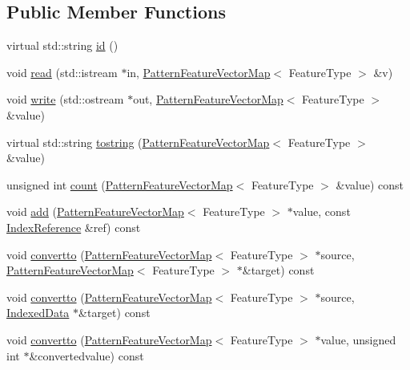 \subsection*{Public Member Functions}
\begin{DoxyCompactItemize}
\item 
virtual std\+::string \hyperlink{classPatternFeatureVectorMapHandler_ac3a86c293fbc3417ae6d8dc13389be82}{id} ()
\item 
void \hyperlink{classPatternFeatureVectorMapHandler_a3956b0d0deccf1a3f36135d084a30627}{read} (std\+::istream $\ast$in, \hyperlink{classPatternFeatureVectorMap}{Pattern\+Feature\+Vector\+Map}$<$ Feature\+Type $>$ \&v)
\item 
void \hyperlink{classPatternFeatureVectorMapHandler_a188df59b0fe05271e3ee90ba20204ffa}{write} (std\+::ostream $\ast$out, \hyperlink{classPatternFeatureVectorMap}{Pattern\+Feature\+Vector\+Map}$<$ Feature\+Type $>$ \&value)
\item 
virtual std\+::string \hyperlink{classPatternFeatureVectorMapHandler_a27faed3107244e4ab0f53e3acea201de}{tostring} (\hyperlink{classPatternFeatureVectorMap}{Pattern\+Feature\+Vector\+Map}$<$ Feature\+Type $>$ \&value)
\item 
unsigned int \hyperlink{classPatternFeatureVectorMapHandler_a67a49821f7c2b8b4d6e1e5be81c36bd4}{count} (\hyperlink{classPatternFeatureVectorMap}{Pattern\+Feature\+Vector\+Map}$<$ Feature\+Type $>$ \&value) const 
\item 
void \hyperlink{classPatternFeatureVectorMapHandler_ab234259fb46c86986d41b0ef81a3b0c0}{add} (\hyperlink{classPatternFeatureVectorMap}{Pattern\+Feature\+Vector\+Map}$<$ Feature\+Type $>$ $\ast$value, const \hyperlink{classIndexReference}{Index\+Reference} \&ref) const 
\item 
void \hyperlink{classPatternFeatureVectorMapHandler_ad69265b8885d3fba7e557a39c3632768}{convertto} (\hyperlink{classPatternFeatureVectorMap}{Pattern\+Feature\+Vector\+Map}$<$ Feature\+Type $>$ $\ast$source, \hyperlink{classPatternFeatureVectorMap}{Pattern\+Feature\+Vector\+Map}$<$ Feature\+Type $>$ $\ast$\&target) const 
\item 
void \hyperlink{classPatternFeatureVectorMapHandler_a8fda95432700c51dd0b7584fb9b47da9}{convertto} (\hyperlink{classPatternFeatureVectorMap}{Pattern\+Feature\+Vector\+Map}$<$ Feature\+Type $>$ $\ast$source, \hyperlink{classIndexedData}{Indexed\+Data} $\ast$\&target) const 
\item 
void \hyperlink{classPatternFeatureVectorMapHandler_a2f61dcfc0704d06b3a0b4ee421bb9a4a}{convertto} (\hyperlink{classPatternFeatureVectorMap}{Pattern\+Feature\+Vector\+Map}$<$ Feature\+Type $>$ $\ast$value, unsigned int $\ast$\&convertedvalue) const 
\end{DoxyCompactItemize}



